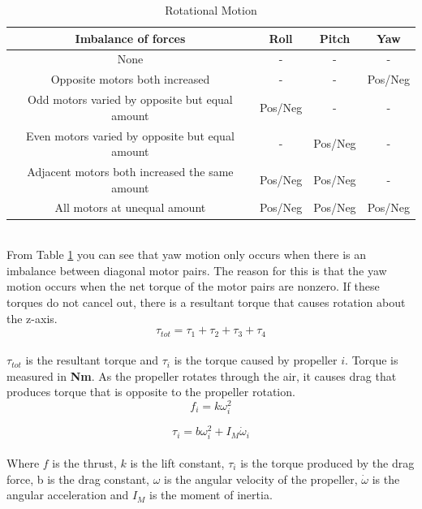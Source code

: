 \begin{table}[h]
\centering
\caption{Rotational Motion}

\begin{tabular}{ |c|c|c|c| } 
 \hline \rowcolor{white}
 \textbf{Imbalance of forces} & \textbf{Roll} & \textbf{Pitch} & \textbf{Yaw} \\
 \hline
 None & - & - & - \\ 
 Opposite motors both increased & - & - & Pos/Neg \\ 
 Odd motors varied by opposite but equal amount & Pos/Neg & - & - \\ 
 Even motors varied by opposite but equal amount & - & Pos/Neg & - \\ 
 Adjacent motors both increased the same amount & Pos/Neg & Pos/Neg & - \\ 
 All motors at unequal amount & Pos/Neg & Pos/Neg & Pos/Neg \\ 
 \hline
\end{tabular}
    \label{tabular:rotmot}
\end{table} \\

From Table \ref{tabular:rotmot} you can see that yaw motion only occurs when there is an imbalance between diagonal motor pairs. The reason for this is that the yaw motion occurs when the net torque of the motor pairs are nonzero. If these torques do not cancel out, there is a resultant torque that causes rotation about the z-axis. 
\begin{equation}
    \label{eq:ttot}
    \tau_{tot} = \tau_1 + \tau_2 + \tau_3 + \tau_4
\end{equation}
\\
$\tau_{tot}$ is the resultant torque and $\tau_i$ is the torque caused by propeller $i$. Torque is measured in \textbf{Nm}. As the propeller rotates through the air, it causes drag that produces torque that is opposite to the propeller rotation. 
\begin{equation}
    \label{eq:kw2}
    f_i = k\omega_i^2
\end{equation}

\begin{equation}
    \tau_i = b\omega_i^2 + I_M\dot{\omega}_i
\end{equation}
\\
Where $f$ is the thrust, $k$ is the lift constant, $\tau_i$ is the torque produced by the drag force, b is the drag constant, $\omega$ is the angular velocity of the propeller, $\dot{\omega}$ is the angular acceleration and $I_M$ is the moment of inertia.\bigskip 

